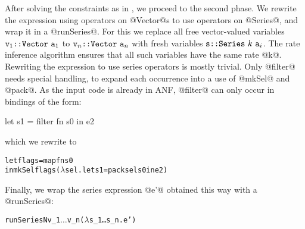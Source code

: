 After solving the constraints as in \cite{Chatterjee:size-access-inference}, we proceed to the second phase. We rewrite the expression using operators on @Vector@s to use operators on @Series@, and wrap it in a @runSeries@. For this we replace all free vector-valued variables $\tt{v}_1 \tt{::} \tt{Vector}~ \tt{a}_1$ to $\tt{v}_n \tt{::} \tt{Vector}~ \tt{a}_n$ with fresh variables $\tt{s} \tt{::} \tt{Series}~ k~ \tt{a}_i$. The rate inference algorithm ensures that all such variables have the same rate @k@. Rewriting the expression to use series operators is mostly trivial. Only @filter@ needs special handling, to expand each occurrence into a use of @mkSel@ and @pack@. As the input code is already in ANF, @filter@ can only occur in bindings of the form:
%
\begin{code}
 let s1 = filter fn s0 
 in  e2
\end{code}  
%
which we rewrite to
%
\begin{alltt}
 let flags = map fn s0
 in  mkSel flags (\(\lambda\)sel. let s1 = pack sel s0 in e2)
\end{alltt}  
%
Finally, we wrap the series expression @e'@ obtained this way with a @runSeries@:
%
\begin{alltt}
 runSeriesN v\_1 \(\ldots\) v_n (\(\lambda\) s\_1 \ldots s\_n. e')
\end{alltt}

